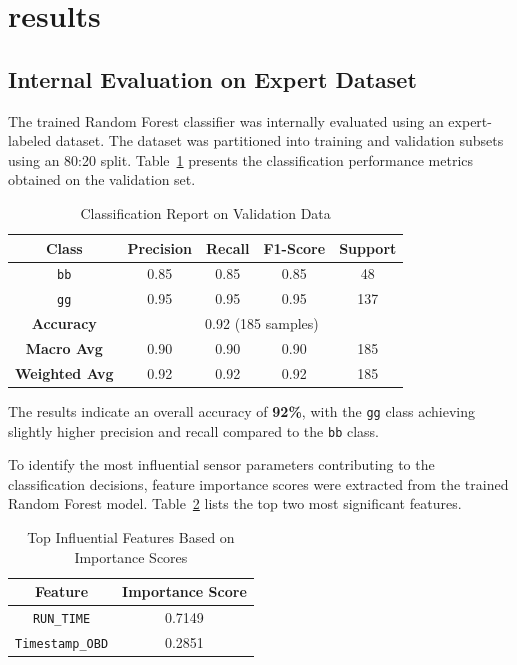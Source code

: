 \section{results}
    \subsection{Internal Evaluation on Expert Dataset}

        The trained Random Forest classifier was internally evaluated using an expert-labeled dataset. The dataset was partitioned into training and validation subsets using an 80:20 split. Table~\ref{tab:classification_report} presents the classification performance metrics obtained on the validation set.

        \begin{table}[h]
        \centering
        \caption{Classification Report on Validation Data}
        \label{tab:classification_report}
        \begin{tabular}{|c|c|c|c|c|}
        \hline
        \textbf{Class} & \textbf{Precision} & \textbf{Recall} & \textbf{F1-Score} & \textbf{Support} \\
        \hline
        \texttt{bb} & 0.85 & 0.85 & 0.85 & 48 \\
        \texttt{gg} & 0.95 & 0.95 & 0.95 & 137 \\
        \hline
        \textbf{Accuracy} & \multicolumn{4}{c|}{0.92 (185 samples)} \\
        \textbf{Macro Avg} & 0.90 & 0.90 & 0.90 & 185 \\
        \textbf{Weighted Avg} & 0.92 & 0.92 & 0.92 & 185 \\
        \hline
        \end{tabular}
        \end{table}

        The results indicate an overall accuracy of \textbf{92\%}, with the \texttt{gg} class achieving slightly higher precision and recall compared to the \texttt{bb} class.

        To identify the most influential sensor parameters contributing to the classification decisions, feature importance scores were extracted from the trained Random Forest model. Table~\ref{tab:feature_importance} lists the top two most significant features.

        \begin{table}[h]
        \centering
        \caption{Top Influential Features Based on Importance Scores}
        \label{tab:feature_importance}
        \begin{tabular}{|c|c|}
        \hline
        \textbf{Feature} & \textbf{Importance Score} \\
        \hline
        \texttt{RUN\_TIME} & 0.7149 \\
        \texttt{Timestamp\_OBD} & 0.2851 \\
        \hline
        \end{tabular}
        \end{table}

